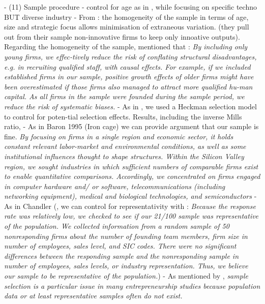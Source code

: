 \begin{itemize}
\begin{itemize}
- (11) Sample procedure
- control for age as in \citep{cooper1994initial}, while focusing on specific techno BUT diverse industry
- From \citep{de2010interrelationships} : the homogeneity of the sample in terms of age, size and strategic focus allows minimisation of extraneous variation. (they pull out from their sample non-innovative firms to keep only innoative outputs). Regarding the homogeneity of the sample, \citet{grillitsch2020does} mentioned that : \textit{By including only young firms, we effec-tively reduce the risk of conflating structural disadvantages, e.g. in recruiting qualified staff, with causal effects. For example, if we included established firms in our sample, positive growth effects of older firms might have been overestimated if those firms also managed to attract more qualified hu-man capital. As all firms in the sample were founded during the sample period, we reduce the risk of systematic biases.}
- As in \citet{reese2020should}, we used a Heckman selection model to control for poten-tial selection effects. Results, including the inverse Mills ratio,
- As in Baron 1995 (Iron cage) we can provide argument that our sample is fine. \textit{By focusing on firms in a single region and economic sector, it holds constant relevant labor-market and environmental conditions, as well as some institutional influences thought to shape structures. Within the Silicon Valley region, we sought industries in which sufficient numbers of comparable firms exist to enable quantitative comparisons. Accordingly, we concentrated on firms engaged in computer hardware and/ or software, telecommunications (including networking equipment), medical and biological technologies, and semiconductors}
- As in Chandler (\citep{chandler2005antecedents}, we can control for representativity with : \textit{Because the response rate was relatively low, we checked to see if our 21/100 sample was representative of the population. We collected information from a random sample of 50 nonresponding firms about the number of founding team members, firm size in number of employees, sales level, and SIC codes. There were no significant differences between the responding sample and the nonresponding sample in number of employees, sales levels, or industry representation. Thus, we believe our sample to be representative of the population.})
- As mentioned by \citet{grillitsch2020does}, \textit{sample selection is a particular issue in many entrepreneurship studies because population data or at least representative samples often do not exist.}


\end{itemize}
\end{itemize}
